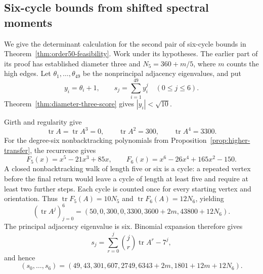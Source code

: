 \documentclass[a4paper,10pt,reqno]{amsart}
\theoremstyle{plain}
\theoremstyle{definition}
\theoremstyle{remark}
\newcommand{\tr}{\operatorname{tr}}
\begin{document}
\subsection{Six-cycle bounds from shifted spectral moments}
\label{app:order50-moment-bounds}

We give the determinant calculation for the second pair of six-cycle
bounds in Theorem~\ref{thm:order50-feasibility}.
Work under its hypotheses.  The earlier part of its proof has established
diameter three and \(N_5=360+m/5\), where \(m\) counts the high edges.
Let \(\theta_1,\ldots,\theta_{49}\) be the nonprincipal adjacency
eigenvalues, and put
\[
 y_i=\theta_i+1,\qquad s_j=\sum_{i=1}^{49}y_i^j\quad(0\le j\le6).
\]
Theorem~\ref{thm:diameter-three-score} gives \(|y_i|<\sqrt{10}\).

Girth and regularity give
\[
 \tr A=\tr A^3=0,\qquad \tr A^2=300,\qquad \tr A^4=3300.
\]
For the degree-six nonbacktracking polynomials from
Proposition~\ref{prop:higher-transfer}, the recurrence gives
\[
 F_5(x)=x^5-21x^3+85x,\qquad
 F_6(x)=x^6-26x^4+165x^2-150.
\]
A closed nonbacktracking walk of length five or six is a cycle: a repeated
vertex before the final return would leave a cycle of length at least five
and require at least two further steps.
Each cycle is counted once for every starting vertex and orientation.
Thus \(\tr F_5(A)=10N_5\) and \(\tr F_6(A)=12N_6\), yielding
\[
 (\tr A^j)_{j=0}^6
 =(50,0,300,0,3300,3600+2m,43800+12N_6).
\]
The principal adjacency eigenvalue is six.  Binomial expansion therefore
gives
\[
 s_j=\sum_{r=0}^j\binom jr\tr A^r-7^j,
\]
and hence
\[
 (s_0,\ldots,s_6)
 =(49,43,301,607,2749,6343+2m,1801+12m+12N_6).
\]
\end{document}
